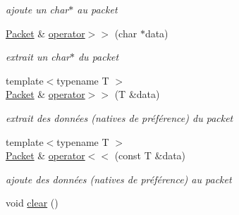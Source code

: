 \begin{DoxyCompactItemize}
\begin{DoxyCompactList}\small\item\em ajoute un char$\ast$ au packet \end{DoxyCompactList}\item 
\hyperlink{classmognetwork_1_1_packet}{Packet} \& \hyperlink{classmognetwork_1_1_packet_ab2a38323cc0a32e79520fdf71ee0d1a9}{operator$>$$>$} (char $\ast$data)
\begin{DoxyCompactList}\small\item\em extrait un char$\ast$ du packet \end{DoxyCompactList}\item 
{\footnotesize template$<$typename T $>$ }\\\hyperlink{classmognetwork_1_1_packet}{Packet} \& \hyperlink{classmognetwork_1_1_packet_acdecf105b9afb3c4c499bfffa9cf2fbb}{operator$>$$>$} (T \&data)
\begin{DoxyCompactList}\small\item\em extrait des données (natives de préférence) du packet \end{DoxyCompactList}\item 
{\footnotesize template$<$typename T $>$ }\\\hyperlink{classmognetwork_1_1_packet}{Packet} \& \hyperlink{classmognetwork_1_1_packet_a84ffd95a38d7bca83675a5c932d04735}{operator$<$$<$} (const T \&data)
\begin{DoxyCompactList}\small\item\em ajoute des données (natives de préférence) au packet \end{DoxyCompactList}\item 
\hypertarget{classmognetwork_1_1_packet_aaa034856ddb45ebf35dcefd6d58563d9}{void \hyperlink{classmognetwork_1_1_packet_aaa034856ddb45ebf35dcefd6d58563d9}{clear} ()}\label{classmognetwork_1_1_packet_aaa034856ddb45ebf35dcefd6d58563d9}


\end{DoxyCompactItemize}
